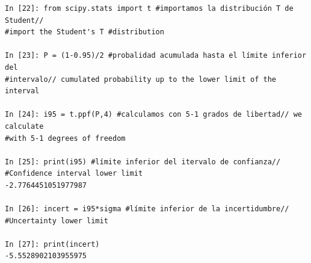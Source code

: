\begin{verbatim}
In [22]: from scipy.stats import t #importamos la distribución T de Student//
#import the Student's T #distribution

In [23]: P = (1-0.95)/2 #probalidad acumulada hasta el límite inferior del 
#intervalo// cumulated probability up to the lower limit of the interval

In [24]: i95 = t.ppf(P,4) #calculamos con 5-1 grados de libertad// we calculate 
#with 5-1 degrees of freedom

In [25]: print(i95) #límite inferior del itervalo de confianza// 
#Confidence interval lower limit 
-2.7764451051977987

In [26]: incert = i95*sigma #límite inferior de la incertidumbre//
#Uncertainty lower limit

In [27]: print(incert)
-5.5528902103955975
\end{verbatim}

